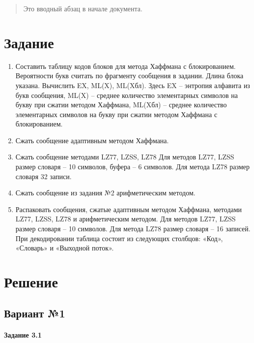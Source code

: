 \documentclass[a4paper, 12pt]{article}
\begin{document}
 
\tableofcontents

\begin{abstract}
  Это вводный абзац в начале документа.
\end{abstract}
 
\section{Задание}
\begin{enumerate}
\item Составить таблицу кодов блоков для метода Хаффмана с блокированием. Вероятности букв считать по фрагменту сообщения в задании. Длина блока указана. Вычислить EX, ML(X), ML(Xбл). Здесь EX – энтропия алфавита из букв сообщения, ML(X) – среднее количество элементарных символов на букву при сжатии методом Хаффмана, ML(Xбл) – среднее количество элементарных символов на букву при сжатии методом Хаффмана с блокированием. 
\item Сжать сообщение адаптивным методом Хаффмана. 
\item Сжать сообщение методами LZ77, LZSS, LZ78  Для методов LZ77, LZSS размер словаря – 10 символов, буфера – 6 символов. Для метода LZ78 размер словаря 32 записи. 
\item Сжать сообщение из задания №2 арифметическим методом. 
\item Распаковать сообщения, сжатые адаптивным методом Хаффмана, методами LZ77, LZSS, LZ78 и арифметическим методом. Для методов LZ77, LZSS размер словаря – 10 символов. Для метода LZ78 размер словаря – 16 записей. При декодировании таблица состоит из следующих столбцов: «Код», «Словарь» и «Выходной поток».
\end{enumerate}
\pagebreak
\section{Решение}
\subsection{Вариант №1}
\paragraph{Задание 3.1}
\end{document}
